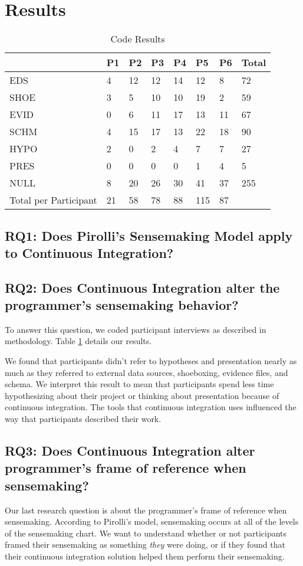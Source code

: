 \documentclass{sig-alternate}
\begin{document}
\section{Results}
\begin{table}
	\centering
	\caption{Code Results}
	\label{table:coderesults}
	\begin{tabular}{ | p{} | l | l | l | l | l | l | l | }
		\hline
		& P1 & P2 & P3 & P4 & P5 & P6 & Total \\ \hline
		EDS & 4 & 12 & 12 & 14 & 12 & 8 & 72 \\ \hline
		SHOE & 3 & 5 & 10 & 10 & 19 & 2 & 59 \\ \hline
		EVID & 0 & 6 & 11 & 17 & 13 & 11 & 67 \\ \hline
		SCHM & 4 & 15 & 17 & 13 & 22 & 18 & 90 \\ \hline
		HYPO & 2 & 0 & 2 & 4 & 7 & 7 & 27 \\ \hline
		PRES & 0 & 0 & 0 & 0 & 1 & 4 & 5 \\ \hline
		NULL & 8 & 20 & 26 & 30 & 41 & 37 & 255 \\ \hline
		Total per Participant & 21 & 58 & 78 & 88 & 115 & 87 &  \\ \hline
	\end{tabular}
\end{table}
\subsection{RQ1:  Does Pirolli's Sensemaking Model apply to Continuous Integration?}
\subsection{RQ2: Does Continuous Integration alter the programmer's sensemaking behavior?}
To answer this question, we coded participant interviews as described in methodology. Table \ref{table:coderesults} details our results. 

We found that participants didn't refer to hypotheses and presentation nearly as much as they referred to external data sources, shoeboxing, evidence files, and schema. We interpret this result to mean that participants spend less time hypothesizing about their project or thinking about presentation because of continuous integration. The tools that continuous integration uses influenced the way that participants described their work.

\subsection{RQ3: Does Continuous Integration alter programmer's frame of reference when sensemaking?}
Our last research question is about the programmer's frame of reference when sensemaking. According to Pirolli's model, sensemaking occurs at all of the levels of the sensemaking chart. We want to understand whether or not participants framed their sensemaking as something \textit{they} were doing, or if they found that their continuous integration solution helped them perform their sensemaking.
\end{document}
